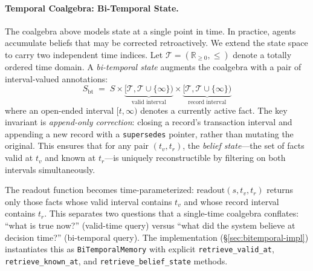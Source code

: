 \paragraph{Temporal Coalgebra: Bi-Temporal State.}
The coalgebra above models state at a single point in time. In practice, agents accumulate beliefs that may be corrected retroactively. We extend the state space to carry two independent time indices. Let $\mathcal{T} = (\mathbb{R}_{\geq 0}, \leq)$ denote a totally ordered time domain. A \emph{bi-temporal state} augments the coalgebra with a pair of interval-valued annotations:
\begin{equation}
S_{\mathrm{bt}} \;=\; S \times \underbrace{[\mathcal{T}, \mathcal{T} \cup \{\infty\})}_{\text{valid interval}} \times \underbrace{[\mathcal{T}, \mathcal{T} \cup \{\infty\})}_{\text{record interval}}
\label{eq:bitemporal-state}
\end{equation}
where an open-ended interval $[t, \infty)$ denotes a currently active fact. The key invariant is \emph{append-only correction}: closing a record's transaction interval and appending a new record with a \texttt{supersedes} pointer, rather than mutating the original. This ensures that for any pair $(t_v, t_r)$, the \emph{belief state}---the set of facts valid at $t_v$ and known at $t_r$---is uniquely reconstructible by filtering on both intervals simultaneously.

The readout function becomes time-parameterized: $\mathrm{readout}(s, t_v, t_r)$ returns only those facts whose valid interval contains $t_v$ and whose record interval contains $t_r$. This separates two questions that a single-time coalgebra conflates: ``what is true now?'' (valid-time query) versus ``what did the system believe at decision time?'' (bi-temporal query). The implementation (\S\ref{sec:bitemporal-impl}) instantiates this as \texttt{BiTemporalMemory} with explicit \texttt{retrieve\_valid\_at}, \texttt{retrieve\_known\_at}, and \texttt{retrieve\_belief\_state} methods.

